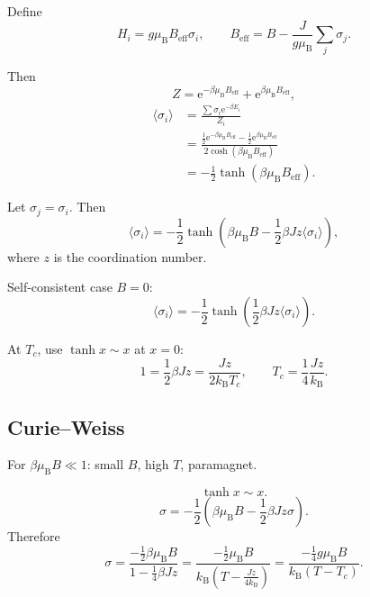 \documentclass[11pt,a4paper]{article}
\newcommand{\ee}{\mathrm{e}}
\newcommand{\kB}{k_{\mathrm B}}
\newcommand{\muB}{\mu_{\mathrm B}}
\begin{document}
Define
\[
  H_i=g\muB B_{\mathrm{eff}}\sigma_i,
  \qquad
  B_{\mathrm{eff}}
  =
  B-\frac{J}{g\muB}\sum_j\sigma_j.
\]

Then
\[
  Z=\ee^{-\beta\muB B_{\mathrm{eff}}}
  +
  \ee^{\beta\muB B_{\mathrm{eff}}},
\]
\[
\begin{aligned}
  \langle\sigma_i\rangle
  &=
  \frac{\sum\sigma_i\ee^{-\beta E_i}}{Z_i}\\
  &=
  \frac{\frac12\ee^{-\beta\muB B_{\mathrm{eff}}}
  -\frac12\ee^{\beta\muB B_{\mathrm{eff}}}}
  {2\cosh(\beta\muB B_{\mathrm{eff}})}\\
  &=
  -\frac12\tanh(\beta\muB B_{\mathrm{eff}}).
\end{aligned}
\]

Let $\sigma_j=\sigma_i$. Then
\[
  \langle\sigma_i\rangle
  =
  -\frac12\tanh
  \left(
  \beta\muB B-\frac12\beta J z\langle\sigma_i\rangle
  \right),
\]
where $z$ is the coordination number.

Self-consistent case $B=0$:
\[
  \langle\sigma_i\rangle
  =
  -\frac12\tanh
  \left(
  \frac12\beta Jz\langle\sigma_i\rangle
  \right).
\]

At $T_c$, use $\tanh x\sim x$ at $x=0$:
\[
  1=\frac12\beta Jz=\frac{Jz}{2\kB T_c},
  \qquad
  T_c=\frac14\frac{Jz}{\kB}.
\]

\begin{center}
\end{center}

\subsection{Curie--Weiss}

For $\beta\muB B\ll 1$: small $B$, high $T$, paramagnet.

\[
  \tanh x\sim x.
\]
\[
  \sigma
  =
  -\frac12
  \left(
  \beta\muB B-\frac12\beta Jz\sigma
  \right).
\]
Therefore
\[
  \sigma
  =
  \frac{-\frac12\beta\muB B}{1-\frac14\beta Jz}
  =
  \frac{-\frac12\muB B}{\kB\left(T-\frac{Jz}{4\kB}\right)}
  =
  \frac{-\frac14 g\muB B}{\kB(T-T_c)}.
\]
\end{document}
